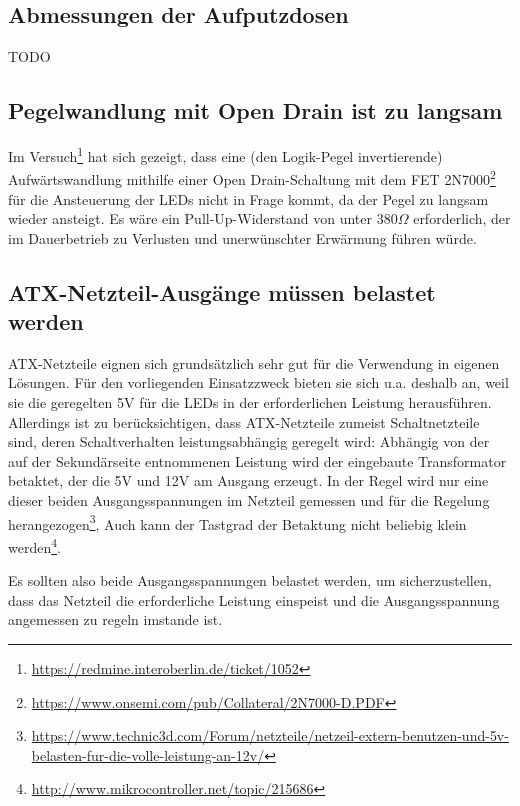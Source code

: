 \subsection{Abmessungen der Aufputzdosen}

TODO

\subsection{Pegelwandlung mit Open Drain ist zu langsam}
Im Versuch\footnote{\url{https://redmine.interoberlin.de/ticket/1052}}
hat sich gezeigt,
dass eine (den Logik-Pegel invertierende) Aufw\"artswandlung
mithilfe einer Open Drain-Schaltung
mit dem FET
2N7000\footnote{\url{https://www.onsemi.com/pub/Collateral/2N7000-D.PDF}}
f\"ur die Ansteuerung der LEDs nicht in Frage kommt,
da der Pegel zu langsam wieder ansteigt.
Es w\"are ein Pull-Up-Widerstand von unter 380$\Omega$ erforderlich,
der im Dauerbetrieb zu Verlusten und
unerw\"unschter Erw\"armung f\"uhren w\"urde.

\subsection{ATX-Netzteil-Ausg\"ange m\"ussen belastet werden}
ATX-Netzteile eignen sich grunds\"atzlich sehr gut
f\"ur die Verwendung in eigenen L\"osungen.
F\"ur den vorliegenden Einsatzzweck bieten sie sich u.a. deshalb an,
weil sie die geregelten 5V
f\"ur die LEDs
in der erforderlichen Leistung
herausf\"uhren.
Allerdings ist zu ber\"ucksichtigen,
dass ATX-Netzteile zumeist Schaltnetzteile sind,
deren Schaltverhalten leistungsabh\"angig geregelt wird:
Abhängig von der auf der Sekund\"arseite entnommenen Leistung
wird der eingebaute Transformator betaktet,
der die 5V und 12V am Ausgang erzeugt.
In der Regel wird nur eine dieser beiden Ausgangsspannungen
im Netzteil gemessen und f\"ur die Regelung
herangezogen\footnote{\url{https://www.technic3d.com/Forum/netzteile/netzeil-extern-benutzen-und-5v-belasten-fur-die-volle-leistung-an-12v/}},
Auch kann der Tastgrad der Betaktung nicht beliebig klein
werden\footnote{\url{http://www.mikrocontroller.net/topic/215686}}.

Es sollten also beide Ausgangsspannungen belastet werden,
um sicherzustellen,
dass das Netzteil die erforderliche Leistung einspeist
und die Ausgangsspannung angemessen zu regeln imstande ist.

